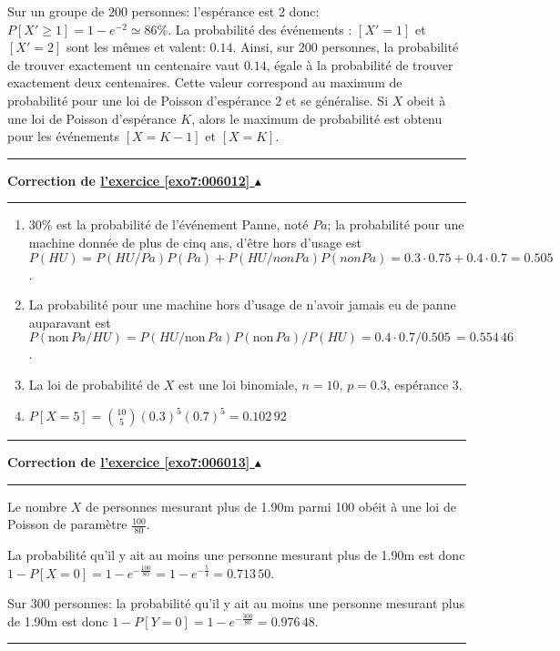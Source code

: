 \documentclass[11pt,a4paper]{article}
\newcounter{exo}
\newcommand{\correction}[1]{\hypertarget{cor7:#1}{}\label{cor7:#1}{\bf Correction de \hyperlink{exo7:#1}{l'exercice \ref{exo7:#1} $\blacktriangle$}}\vspace{1mm}\hrule\vspace{1mm}}
\newcommand{\fincorrection}{\vspace{1mm}\hrule\vspace*{7mm}}
\begin{document}
Sur un groupe de $200$ personnes: l'espérance est 2 donc: $P[X'\geq 1]=1-e^{-2}\simeq 86\%.$
La probabilité des événements : $[X' =1]$ et $[X' =2]$
sont les mêmes et valent: $0.14$.
Ainsi, sur 200 personnes, la probabilité de trouver exactement un
centenaire vaut $0.14$, égale à la probabilité de trouver
exactement deux centenaires. Cette valeur correspond au maximum de probabilité 
pour une loi de Poisson d'espérance $2$ et se généralise.
Si $X$ obeit à une loi de Poisson d'espérance $K$, alors le maximum de
probabilité est obtenu pour les événements $[X=K-1]$ et $[X=K].$
\fincorrection
\correction{006012}
\begin{enumerate}
\item 30\% est la probabilité de l'événement Panne, noté $Pa$;
la probabilité pour une machine donnée de plus de cinq ans, d'être hors d'usage est
$P(HU)=P(HU/Pa) P(Pa)+P(HU/nonPa) P(nonPa)=0.3\cdot 0.75+0.4\cdot
0.7=0.505$.

\item La probabilité pour une machine hors d'usage de n'avoir jamais eu de
panne auparavant est 
$P(\text{non}\,Pa/HU)=P(HU/\text{non}\,Pa) P(\text{non}\,Pa)/P(HU)=0.4\cdot 0.7/
0.505\,=0.554\,46$.

\item La loi de probabilité de $X$ est une loi binomiale, $n= 10$, $p=0.3$, espérance $3$.

\item $P[X=5]=\binom{10}{5}(0.3)^{5}(0.7)^{5}=0.102\,92$
\end{enumerate}
\fincorrection
\correction{006013}
Le nombre $X$ de personnes mesurant plus de 1.90m parmi 100 obéit à
une loi de Poisson de paramètre $\frac{100}{80}$.

La probabilité qu'il y ait au moins une personne mesurant plus de 1.90m
est donc $1-P[X=0]=1-e^{-\frac{100}{80}}=1-e^{-\frac{5}{4}}=0.713\,50$.

Sur 300 personnes:
la probabilité qu'il y ait au moins une personne mesurant plus de 1.90m
est donc $1-P[Y=0]=1-e^{-\frac{300}{80}}=0.976\,48$.

\fincorrection
\end{document}
